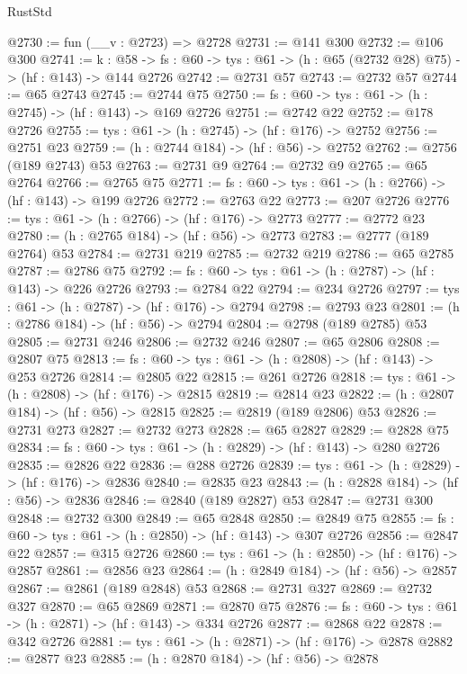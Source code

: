 \begin{lexlean}{RustStd}
\begin{coremodule}
@2730 := fun (__v : @2723) => @2728
@2731 := @141 @300
@2732 := @106 @300
@2741 := {k : @58} ->
  {fs : @60} -> {tys : @61} -> (h : @65 (@2732 @28) @75) -> (hf : @143) -> @144 @2726
@2742 := @2731 @57
@2743 := @2732 @57
@2744 := @65 @2743
@2745 := @2744 @75
@2750 := {fs : @60} -> {tys : @61} -> (h : @2745) -> (hf : @143) -> @169 @2726
@2751 := @2742 @22
@2752 := @178 @2726
@2755 := {tys : @61} -> (h : @2745) -> (hf : @176) -> @2752
@2756 := @2751 @23
@2759 := (h : @2744 @184) -> (hf : @56) -> @2752
@2762 := @2756 (@189 @2743) @53
@2763 := @2731 @9
@2764 := @2732 @9
@2765 := @65 @2764
@2766 := @2765 @75
@2771 := {fs : @60} -> {tys : @61} -> (h : @2766) -> (hf : @143) -> @199 @2726
@2772 := @2763 @22
@2773 := @207 @2726
@2776 := {tys : @61} -> (h : @2766) -> (hf : @176) -> @2773
@2777 := @2772 @23
@2780 := (h : @2765 @184) -> (hf : @56) -> @2773
@2783 := @2777 (@189 @2764) @53
@2784 := @2731 @219
@2785 := @2732 @219
@2786 := @65 @2785
@2787 := @2786 @75
@2792 := {fs : @60} -> {tys : @61} -> (h : @2787) -> (hf : @143) -> @226 @2726
@2793 := @2784 @22
@2794 := @234 @2726
@2797 := {tys : @61} -> (h : @2787) -> (hf : @176) -> @2794
@2798 := @2793 @23
@2801 := (h : @2786 @184) -> (hf : @56) -> @2794
@2804 := @2798 (@189 @2785) @53
@2805 := @2731 @246
@2806 := @2732 @246
@2807 := @65 @2806
@2808 := @2807 @75
@2813 := {fs : @60} -> {tys : @61} -> (h : @2808) -> (hf : @143) -> @253 @2726
@2814 := @2805 @22
@2815 := @261 @2726
@2818 := {tys : @61} -> (h : @2808) -> (hf : @176) -> @2815
@2819 := @2814 @23
@2822 := (h : @2807 @184) -> (hf : @56) -> @2815
@2825 := @2819 (@189 @2806) @53
@2826 := @2731 @273
@2827 := @2732 @273
@2828 := @65 @2827
@2829 := @2828 @75
@2834 := {fs : @60} -> {tys : @61} -> (h : @2829) -> (hf : @143) -> @280 @2726
@2835 := @2826 @22
@2836 := @288 @2726
@2839 := {tys : @61} -> (h : @2829) -> (hf : @176) -> @2836
@2840 := @2835 @23
@2843 := (h : @2828 @184) -> (hf : @56) -> @2836
@2846 := @2840 (@189 @2827) @53
@2847 := @2731 @300
@2848 := @2732 @300
@2849 := @65 @2848
@2850 := @2849 @75
@2855 := {fs : @60} -> {tys : @61} -> (h : @2850) -> (hf : @143) -> @307 @2726
@2856 := @2847 @22
@2857 := @315 @2726
@2860 := {tys : @61} -> (h : @2850) -> (hf : @176) -> @2857
@2861 := @2856 @23
@2864 := (h : @2849 @184) -> (hf : @56) -> @2857
@2867 := @2861 (@189 @2848) @53
@2868 := @2731 @327
@2869 := @2732 @327
@2870 := @65 @2869
@2871 := @2870 @75
@2876 := {fs : @60} -> {tys : @61} -> (h : @2871) -> (hf : @143) -> @334 @2726
@2877 := @2868 @22
@2878 := @342 @2726
@2881 := {tys : @61} -> (h : @2871) -> (hf : @176) -> @2878
@2882 := @2877 @23
@2885 := (h : @2870 @184) -> (hf : @56) -> @2878

\end{coremodule}
\end{lexlean}
